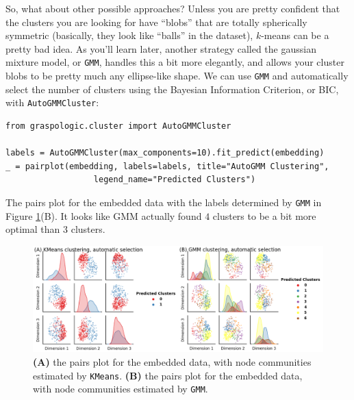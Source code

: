 So, what about other possible approaches? Unless you are pretty confident that the clusters you are looking for have ``blobs'' that are totally spherically symmetric (basically, they look like ``balls'' in the dataset), $k$-means can be a pretty bad idea. As you'll learn later, another strategy called the gaussian mixture model, or \texttt{GMM}, handles this a bit more elegantly, and allows your cluster blobs to be pretty much any ellipse-like shape. We can use \texttt{GMM} and automatically select the number of clusters using the Bayesian Information Criterion, or BIC, with \texttt{AutoGMMCluster}:
\begin{lstlisting}[style=python]
from graspologic.cluster import AutoGMMCluster

labels = AutoGMMCluster(max_components=10).fit_predict(embedding)
_ = pairplot(embedding, labels=labels, title="AutoGMM Clustering", 
                  legend_name="Predicted Clusters")
\end{lstlisting}
The pairs plot for the embedded data with the labels determined by \texttt{GMM} in Figure \ref{fig:ch2:pairplots_impute}(B). It looks like GMM actually found $4$ clusters to be a bit more optimal than $3$ clusters. 

\begin{figure}
    \centering
    \includegraphics[width=\linewidth]{foundations/ch2/Images/pairplots_impute.png}
    \caption[Comparison of labels estimated by $k$-means and GMM]{\textbf{(A)} the pairs plot for the embedded data, with node communities estimated by \texttt{KMeans}. \textbf{(B)} the pairs plot for the embedded data, with node communities estimated by \texttt{GMM}.}
    \label{fig:ch2:pairplots_impute}
\end{figure}

\newpage